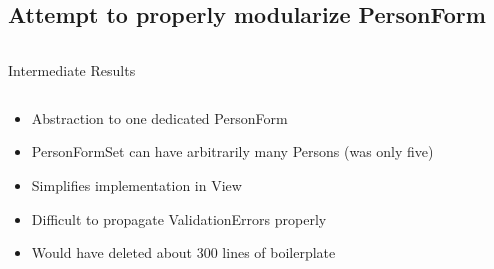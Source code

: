 % 


\subsection{Attempt to properly modularize PersonForm}
\begin{frame}[c]
    \scriptsize
    \inputminted[linenos]{python}{code/personform.py}
\end{frame}




\begin{frame}[c]{Intermediate Results}
    \begin{multicols}{2}
        \tiny
        \inputminted[linenos]{python}{code/personforms.py}
        \normalsize
        \begin{itemize}[<+(1)->]
            \item Abstraction to one dedicated PersonForm
            \item PersonFormSet can have arbitrarily many Persons (was only five)
            \item Simplifies implementation in View
            \item Difficult to propagate ValidationErrors properly
            \item Would have deleted about 300 lines of boilerplate
        \end{itemize}
    \end{multicols}
\end{frame}

